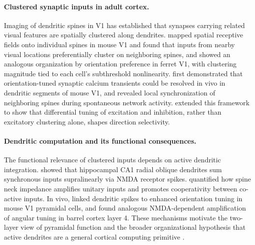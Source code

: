 \paragraph{Clustered synaptic inputs in adult cortex.}
Imaging of dendritic spines in V1 has established that synapses carrying related visual features are spatially clustered along dendrites. \citet{iacaruso2017synaptic} mapped spatial receptive fields onto individual spines in mouse V1 and found that inputs from nearby visual locations preferentially cluster on neighboring spines, and \citet{wilson2016orientation} showed an analogous organization by orientation preference in ferret V1, with clustering magnitude tied to each cell's subthreshold nonlinearity. \citet{jia2010dendritic} first demonstrated that orientation-tuned synaptic calcium transients could be resolved in vivo in dendritic segments of mouse V1, and \citet{takahashi2012locally} revealed local synchronization of neighboring spines during spontaneous network activity. \citet{wilson2018differential} extended this framework to show that differential tuning of excitation and inhibition, rather than excitatory clustering alone, shapes direction selectivity.

\paragraph{Dendritic computation and its functional consequences.}
The functional relevance of clustered inputs depends on active dendritic integration. \citet{losonczy2006integrative} showed that hippocampal CA1 radial oblique dendrites sum synchronous inputs supralinearly via NMDA receptor spikes. \citet{harnett2012synaptic} quantified how spine neck impedance amplifies unitary inputs and promotes cooperativity between co-active inputs. In vivo, \citet{smith2013dendritic} linked dendritic spikes to enhanced orientation tuning in mouse V1 pyramidal cells, and \citet{lavzin2012nonlinear} found analogous NMDA-dependent amplification of angular tuning in barrel cortex layer 4. These mechanisms motivate the two-layer view of pyramidal function \citep{poirazi2003pyramidal} and the broader organizational hypothesis that active dendrites are a general cortical computing primitive \citep{larkum2013cellular,makara2013variable}.

